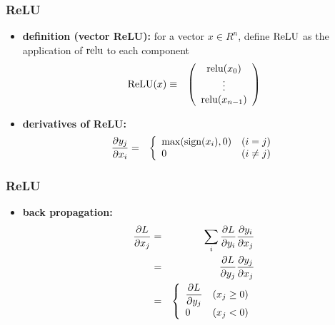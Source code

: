 \documentclass[12pt,dvipdfmx]{beamer}
\newcommand{\ao}[1]{{\color{blue}#1}}
\begin{document}
\begin{frame}
\frametitle{ReLU}
\begin{itemize}
\item \ao{\textbf{definition (vector ReLU):}}
for a vector $x \in R^n$, define $\mbox{ReLU}$ as the application
of $\mbox{relu}$ to each component
\begin{eqnarray*}
\mbox{ReLU}(x) & \equiv & \left(\begin{array}{c} \mbox{relu}(x_0) \\ \vdots \\ \mbox{relu}(x_{n-1}) \end{array}\right)
\end{eqnarray*}

\item \ao{\bf derivatives of ReLU:} 
  \begin{eqnarray*}
    \frac{\partial y_j}{\partial x_i} & = & \left\{
                        \begin{array}{ll}
                          \max(\mbox{sign}(x_i), 0) & (i = j) \\
                          0 & (i \neq j) \\
                        \end{array}
                        \right.
  \end{eqnarray*}
\end{itemize}
\end{frame}

\begin{frame}
\frametitle{ReLU}
\begin{itemize}
\item \ao{\textbf{back propagation:}}
  \begin{eqnarray*}
    \frac{\partial L}{\partial x_j} & = & \sum_i \frac{\partial L}{\partial y_i} \frac{\partial y_i}{\partial x_j} \\
                & = & \frac{\partial L}{\partial y_j} \frac{\partial y_j}{\partial x_j} \\
                & = & \left\{
                      \begin{array}{ll}
                        {\displaystyle \frac{\partial L}{\partial y_j}} & (x_j \geq 0) \\
                        0 & (x_j < 0) \\
                      \end{array}
    \right.
  \end{eqnarray*}
\end{itemize}
\end{frame}
\end{document}
